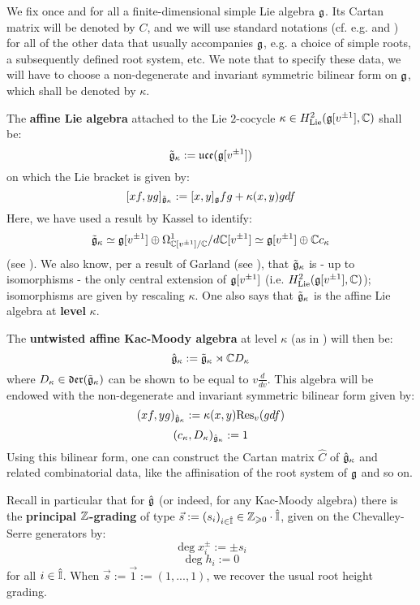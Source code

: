         We fix once and for all a finite-dimensional simple Lie algebra $\mathfrak{g}$. Its Cartan matrix will be denoted by $C$, and we will use standard notations (cf. e.g. \cite{humphreys_lie_algebras} and \cite{kac_infinite_dimensional_lie_algebras}) for all of the other data that usually accompanies $\mathfrak{g}$, e.g. a choice of simple roots, a subsequently defined root system, etc. We note that to specify these data, we will have to choose a non-degenerate and invariant symmetric bilinear form on $\mathfrak{g}$, which shall be denoted by $\kappa$.

        The \textbf{affine Lie algebra} attached to the Lie $2$-cocycle $\kappa \in H^2_{\mathrm{Lie}}(\mathfrak{g}[v^{\pm 1}], \mathbb{C})$ shall be:
            $$\tilde{\mathfrak{g}}_{\kappa} := \mathfrak{uce}(\mathfrak{g}[v^{\pm 1}])$$
        on which the Lie bracket is given by:
            $$[xf, yg]_{\tilde{\mathfrak{g}}_{\kappa}} := [x, y]_{\mathfrak{g}} fg + \kappa(x, y) g df$$
        Here, we have used a result by Kassel to identify:
            $$\tilde{\mathfrak{g}}_{\kappa} \simeq \mathfrak{g}[v^{\pm 1}] \oplus \Omega^1_{\mathbb{C}[v^{\pm 1}]/\mathbb{C}}/d\mathbb{C}[v^{\pm 1}] \simeq \mathfrak{g}[v^{\pm 1}] \oplus \mathbb{C} c_{\kappa}$$
        (see \cite{kassel_universal_central_extensions_of_lie_algebras}). We also know, per a result of Garland (see \cite{garland_arithmetics_of_loop_groups}), that $\tilde{\mathfrak{g}}_{\kappa}$ is - up to isomorphisms - the only central extension of $\mathfrak{g}[v^{\pm 1}]$ (i.e. $H^2_{\mathrm{Lie}}(\mathfrak{g}[v^{\pm 1}], \mathbb{C})$); isomorphisms are given by rescaling $\kappa$. One also says that $\tilde{\mathfrak{g}}_{\kappa}$ is the affine Lie algebra at \textbf{level} $\kappa$.

        The \textbf{untwisted affine Kac-Moody algebra} at level $\kappa$ (as in \cite[Chapter 7]{kac_infinite_dimensional_lie_algebras}) will then be:
            $$\hat{\mathfrak{g}}_{\kappa} := \tilde{\mathfrak{g}}_{\kappa} \rtimes \mathbb{C} D_{\kappa}$$
        where $D_{\kappa} \in \mathfrak{der}(\tilde{\mathfrak{g}}_{\kappa})$ can be shown to be equal to $v\frac{d}{dv}$. This algebra will be endowed with the non-degenerate and invariant symmetric bilinear form given by:
            $$(xf, yg)_{\hat{\mathfrak{g}}_{\kappa}} := \kappa(x, y) \mathrm{Res}_v (g df)$$
            $$(c_{\kappa}, D_{\kappa})_{\hat{\mathfrak{g}}_{\kappa}} := 1$$
        Using this bilinear form, one can construct the Cartan matrix $\hat{C}$ of $\hat{\mathfrak{g}}_{\kappa}$ and related combinatorial data, like the affinisation of the root system of $\mathfrak{g}$ and so on.
            
        Recall in particular that for $\hat{\mathfrak{g}}$ (or indeed, for any Kac-Moody algebra) there is the \textbf{principal $\mathbb{Z}$-grading} of type $\vec{s} := (s_i)_{i \in \hat{\mathbb{I}}} \in \mathbb{Z}_{\geqslant 0} \cdot \hat{\mathbb{I}}$, given on the Chevalley-Serre generators by:
            $$\deg x_i^{\pm} := \pm s_i$$
            $$\deg h_i := 0$$
        for all $i \in \hat{\mathbb{I}}$. When $\vec{s} := \vec{1} := (1, ..., 1)$, we recover the usual root height grading. 
    
